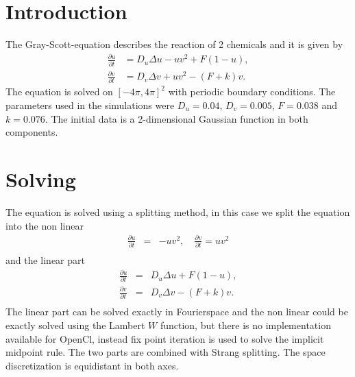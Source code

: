 \documentclass{sig-alternate-05-2015}
\begin{document}


%
%

%
%
\printccsdesc



\section{Introduction}
The Gray-Scott-equation\cite{grayscott} describes the reaction of 2 chemicals and it is given by 
\vspace{1mm}
\begin{align*}
\frac{\partial u}{\partial t}&= D_u\Delta u-uv^2+F(1-u),\\
\frac{\partial v}{\partial t}&= D_v\Delta v+uv^2-(F+k)v.
\end{align*}
\vspace{-1.75mm}$~$\\
The equation is solved on $[-4\pi,4\pi]^2$ with periodic boundary conditions.
The parameters used in the simulations were $D_u=0.04$, $D_v=0.005$, $F=0.038$ and $k=0.076$. The initial data is a 2-dimensional Gaussian function in both components.

\section{Solving}
The equation is solved using a splitting method, in this case we split the equation into the non linear 
\begin{eqnarray*}
\frac{\partial u}{\partial t}&=& -uv^2 ,\quad \frac{\partial v}{\partial t}=uv^2 \\
\end{eqnarray*}
and the linear part
\begin{eqnarray*}
\frac{\partial u}{\partial t}&=& D_u\Delta u+F(1-u), \\
\frac{\partial v}{\partial t}&=& D_v\Delta v-(F+k)v. \\
 \end{eqnarray*} 
 The linear part can be solved exactly in Fourierspace and the non linear could be exactly solved using the Lambert $W$ function, but there is no implementation available for OpenCl, instead fix point iteration is used to solve the implicit midpoint rule. The two parts are combined with Strang splitting\cite{splitting}. The space discretization is equidistant in both axes.
\end{document}
